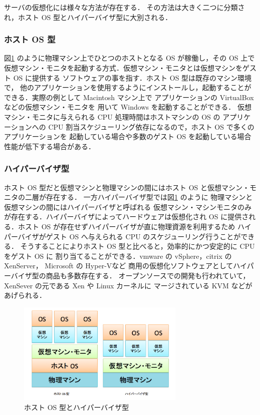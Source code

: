 \documentclass[graduation-thesis]{mlarticle}
\begin{document}
サーバの仮想化には様々な方法が存在する．
その方法は大きく二つに分類され，ホスト OS 型とハイパーバイザ型に大別される．

\subsubsection{ホスト OS 型}
\label{sec-2-1-3}
図\ref{host_vs_hyper} のように物理マシン上でひとつのホストとなる OS が稼働し，その OS 上で
仮想マシン・モニタを起動する方式．仮想マシン・モニタとは仮想マシンをゲスト OS に提供する
ソフトウェアの事を指す．ホスト OS 型は既存のマシン環境で，
他のアプリケーションを使用するようにインストールし，起動することが
できる．実際の例として Macintosh マシン上で
アプリケーションの VirtualBox\cite{virtualbox} などの仮想マシン・モニタを
用いて Windows を起動することができる．
仮想マシン・モニタに与えられる CPU 処理時間はホストマシンの OS の
アプリケーションへの CPU 割当スケジューリング依存になるので，ホスト OS で多くのアプリケーションを
起動している場合や多数のゲスト OS を起動している場合性能が低下する場合がある．
\subsubsection{ハイパーバイザ型}
\label{sec-2-1-4}
ホスト OS 型だと仮想マシンと物理マシンの間にはホスト OS と仮想マシン・モニタの二層が存在する．
一方ハイパーバイザ型では図\ref{host_vs_hyper} のように
物理マシンと仮想マシンの間にはハイパーバイザと呼ばれる
仮想マシン・マシンモニタのみが存在する．ハイパーバイザによってハードウェアは仮想化され
OS に提供される．ホスト OS が存在せずハイパーバイザが直に物理資源を利用するため
ハイパーバイザがゲスト OS へ与えられる CPU のスケジューリング行うことができる．
そうすることによりホスト OS 型と比べると，効率的にかつ安定的に CPU をゲスト OS に
割り当てることができる．vmware の vSphere\cite{vsphere}，citrix の XenServer\cite{xenserver}，
Microsoft の Hyper-V\cite{hyper-v}など
商用の仮想化ソフトウェアとしてハイパーバイザ型の商品も多数存在する．
オープンソースでの開発も行われていて，XenSever の元である Xen\cite{xen} や Linux カーネルに
マージされている KVM\cite{kvm} などがあげられる．
\begin{figure}[H]\begin{center}\includegraphics[width=8.0cm]{./img/host_vs_hyper.png}\caption{ ホスト OS 型とハイパーバイザ型}\label{host_vs_hyper}\end{center}\end{figure}
\end{document}
